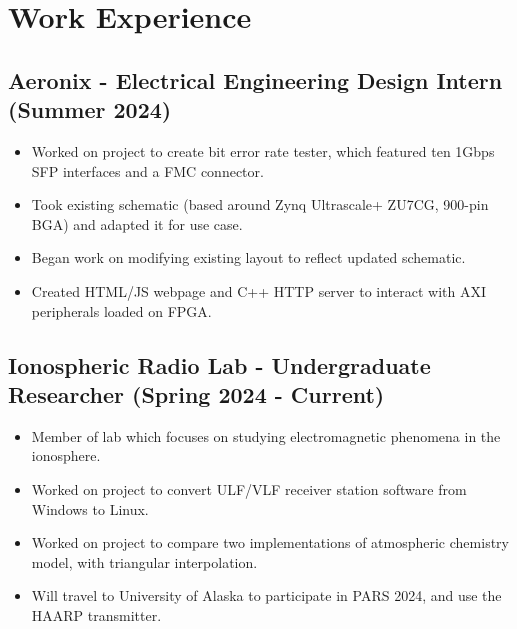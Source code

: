 \documentclass{article}
\newcommand{\sectionspacing}{\vspace{-0em}} %
\newenvironment{CustomItemize}
{ \begin{itemize}[leftmargin=1em]
    \setlength{\itemsep}{0pt}
    \setlength{\parskip}{0pt}
    \setlength{\parindent}{0pt}
    \setlength{\parsep}{0pt}     }
{ \end{itemize}                  }
\begin{document}

\sectionspacing{}

\section{Work Experience}
\subsection{Aeronix - Electrical Engineering Design Intern (Summer 2024)}
\begin{CustomItemize}
\item Worked on project to create bit error rate tester, which featured ten 1Gbps SFP interfaces and a FMC connector.
\item Took existing schematic (based around Zynq Ultrascale+ ZU7CG, 900-pin BGA) and adapted it for use case.
\item Began work on modifying existing layout to reflect updated schematic.
\item Created HTML/JS webpage and C++ HTTP server to interact with AXI peripherals loaded on FPGA.
\end{CustomItemize}

\subsection{Ionospheric Radio Lab - Undergraduate Researcher (Spring 2024 - Current)}
\begin{CustomItemize}
\item Member of lab which focuses on studying electromagnetic phenomena in the ionosphere.
\item Worked on project to convert ULF/VLF receiver station software from Windows to Linux.
\item Worked on project to compare two implementations of atmospheric chemistry model, with triangular interpolation.
\item Will travel to University of Alaska to participate in PARS 2024, and use the HAARP transmitter.
\end{CustomItemize}
\end{document}
